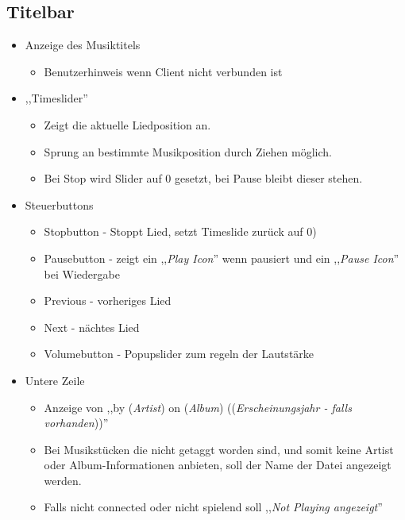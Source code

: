 
\subsection{Titelbar}
\begin{itemize}
	\item Anzeige des Musiktitels
	\begin{itemize}
		\item Benutzerhinweis wenn Client nicht verbunden ist
	\end{itemize}
	\item ,,Timeslider''
	\begin{itemize}
		\item Zeigt die aktuelle Liedposition an.
		\item Sprung an bestimmte Musikposition durch Ziehen möglich.
		\item Bei Stop wird Slider auf 0 gesetzt, bei Pause  bleibt dieser stehen.
	\end{itemize}
	\item Steuerbuttons
	\begin{itemize}
		\item Stopbutton - Stoppt Lied, setzt Timeslide zurück auf 0)
        \item Pausebutton - zeigt ein ,,\emph{Play Icon}'' wenn pausiert und ein ,,\emph{Pause Icon}'' bei Wiedergabe
		\item Previous - vorheriges Lied
		\item Next - nächtes Lied
		\item Volumebutton - Popupslider zum regeln der Lautstärke
	\end{itemize}
	\item Untere Zeile
	\begin{itemize}
        \item Anzeige von ,,by (\emph{Artist}) on (\emph{Album}) ((\emph{Erscheinungsjahr - falls vorhanden}))''
        \item Bei Musikstücken die nicht getaggt worden sind, und somit keine Artist oder Album-Informationen anbieten,
            soll der Name der Datei angezeigt werden. 
        \item Falls nicht connected oder nicht spielend soll ,,\emph{Not Playing angezeigt}''
    \end{itemize}		
\end{itemize} 



